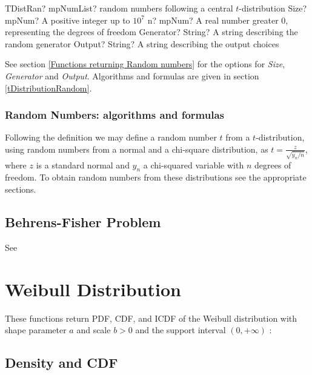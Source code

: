 \begin{mpFunctionsExtract}
	\mpFunctionFourNotImplemented
	{TDistRan? mpNumList? random numbers following a central $t$-distribution}
	{Size? mpNum? A positive integer up to $10^7$}
	{n? mpNum? A real number greater 0, representing the degrees of freedom}
	{Generator? String? A string describing the random generator}
	{Output? String? A string describing the output choices}
\end{mpFunctionsExtract}

\vspace{0.3cm}

See section \ref{Functions returning Random numbers} for the options for  {\itshape\sffamily Size},  {\itshape\sffamily Generator} and {\itshape\sffamily Output}. Algorithms and formulas are given in section \ref{tDistributionRandom}.


\subsubsection{Random Numbers: algorithms and formulas}

Following the definition we may define a random number $t$ from a $t$-distribution, using
random numbers from a normal and a chi-square distribution, as $t=\frac{z}{\sqrt{y_n/n}}$, 
where $z$ is a standard normal and $y_n$ a chi-squared variable with $n$ degrees of freedom. To obtain random numbers from these distributions see the appropriate sections.



\subsection{Behrens-Fisher Problem}

See \cite{Golhar_1972}




\newpage
\section{Weibull Distribution}
\label{WeibullDistribution}

These functions return PDF, CDF, and ICDF of the Weibull distribution with shape parameter $a$ and scale
$b > 0$ and the support interval $(0,+\infty)$ :



\subsection{Density and CDF}

